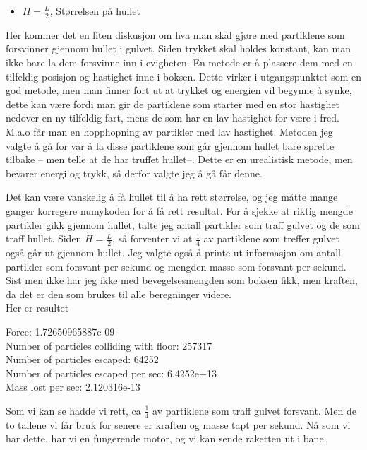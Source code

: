 \documentclass[a4paper,norsk,11pt,twoside]{article}
\begin{document}
\begin{itemize}
\item $H = \frac{L}{2}$, Størrelsen på hullet
\end{itemize}

Her kommer det en liten diskusjon om hva man skal gjøre med partiklene som forsvinner gjennom hullet i gulvet. Siden trykket skal holdes konstant, kan man ikke bare la dem forsvinne inn i evigheten. En metode er å plassere dem med en tilfeldig posisjon og hastighet inne i boksen. Dette virker i utgangspunktet som en god metode, men man finner fort ut at trykket og energien vil begynne å synke, dette kan være fordi man gir de partiklene som starter med en stor hastighet nedover en ny tilfeldig fart, mens de som har en lav hastighet for være i fred. M.a.o får man en hopphopning av partikler med lav hastighet. Metoden jeg valgte å gå for var å la disse partiklene som går gjennom hullet bare sprette tilbake -- men telle at de har truffet hullet--. Dette er en urealistisk metode, men bevarer energi og trykk, så derfor valgte jeg å gå får denne.

Det kan være vanskelig å få hullet til å ha rett størrelse, og jeg måtte mange ganger korregere numykoden for å få rett resultat. For å sjekke at riktig mengde partikler gikk gjennom hullet, talte jeg antall partikler som traff gulvet og de som traff hullet. Siden $H = \frac{L}{2}$, så forventer vi at $\frac{1}{4}$ av partiklene som treffer gulvet også går ut gjennom hullet. Jeg valgte også å printe ut informasjon om antall partikler som forsvant per sekund og mengden masse som forsvant per sekund.\\

Sist men ikke har jeg ikke med bevegelsesmengden som boksen fikk, men kraften, da det er den som brukes til alle beregninger videre. \\

Her er resultet


\begin{tcolorbox}
Force:  1.72650965887e-09 \\
Number of particles colliding with floor:  257317 \\
Number of particles escaped:  64252 \\
Number of particles escaped per sec:  6.4252e+13 \\
Mass lost per sec:  2.120316e-13
\end{tcolorbox}

Som vi kan se hadde vi rett, ca $\frac{1}{4}$ av partiklene som traff gulvet forsvant. Men de to tallene vi får bruk for senere er kraften og masse tapt per sekund. Nå som vi har dette, har vi en fungerende motor, og vi kan sende raketten ut i bane.
\end{document}
